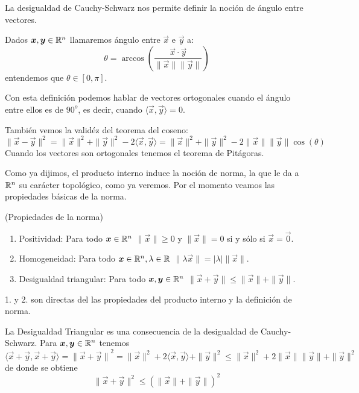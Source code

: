 La desigualdad de Cauchy-Schwarz nos permite definir la noci\'on de \'angulo entre vectores.
\begin{definicion} Dados $\boldsymbol{x},\boldsymbol{y} \in \mathbb{R}^n$ llamaremos \'angulo entre $\vec{x}$ e $\vec{y}$ a:
$$\theta = \arccos\left(\frac{\vec{x}\cdot \vec{y}}{\|\vec{x}\| \|\vec{y}\|}\right)$$
entendemos que $\theta\in [0,\pi]$.
\end{definicion}
Con esta definici\'on podemos hablar de vectores ortogonales cuando el
\'angulo entre ellos es de $90^o$, es decir, cuando $\langle \vec{x},\vec{y}\rangle=0$.
 
Tambi\'en vemos la valid\'ez del teorema del coseno:
$$\|\vec{x}-\vec{y}\|^2=\|\vec{x}\|^2+\|\vec{y}\|^2-2\langle \vec{x}, \vec{y}\rangle =\|\vec{x}\|^2+\|\vec{y}\|^2- 2\|\vec{x}\|\|\vec{y}\|\cos(\theta)$$
Cuando los vectores son ortogonales tenemos el teorema de Pit\'agoras.

\medskip

Como ya dijimos, el producto interno induce la noci\'on de norma, la que le da a
$\mathbb{R}^n$ su car\'acter topol\'ogico, como ya veremos. Por el momento veamos las
propiedades b\'asicas de la norma.

\begin{proposicion}{\rm (Propiedades de la norma)}
\begin{enumerate}
\item Positividad: Para todo ${\boldsymbol{x}} \in \mathbb{R}^n$ $\|\vec{x}\|\ge 0$ y  $\|\vec{x}\|=0$ si y s\'olo si $\vec{x}=\vec{0}$.
\item Homogeneidad: Para todo ${\boldsymbol{x}} \in \mathbb{R}^n, \lambda\in \mathbb{R}$ $\|\lambda{\vec{x}}\|=|\lambda|\|\vec{x}\|$.
\item Desigualdad triangular: Para todo ${\boldsymbol{x}, \boldsymbol{y}} \in \mathbb{R}^n$ $\|\vec{x}+\vec{y}\| \leq \|\vec{x}\|+\|\vec{y}\|$.
\end{enumerate}
\end{proposicion}
\begin{demostracion} 
1. y 2. son directas del las propiedades del producto
interno y la definici\'on de norma.

La Desigualdad Triangular es una consecuencia de la desigualdad de Cauchy-Schwarz.
Para $\boldsymbol{x},\boldsymbol{y}\in\mathbb{R}^n$ tenemos
$$\langle \vec{x}+\vec{y}, \vec{x}+\vec{y}\rangle ={\|\vec{x}+\vec{y}\|}^2=\|\vec{x}\|^2+2\langle \vec{x}, \vec{y}\rangle 
+\|\vec{y}\|^2 \leq \|\vec{x}\|^2+2\|\vec{x}\|\|\vec{y}\|+\|\vec{y}\|^2
$$
de donde se obtiene
$$
\|\vec{x}+\vec{y}\|^2 \leq (\|\vec{x}\|+\|\vec{y}\|)^2
$$
\end{demostracion}

